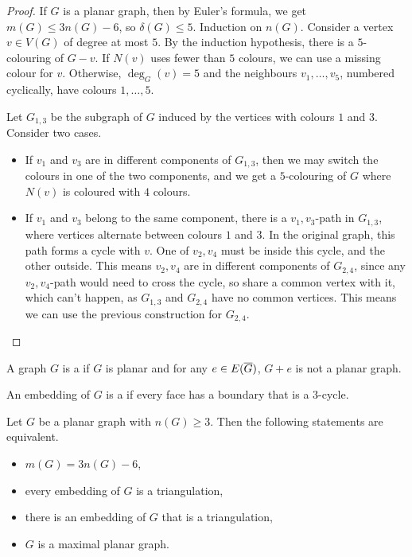 \begin{proof}
  If $G$ is a planar graph, then by Euler's formula, we get $m(G) \le 3n(G) -
  6$, so $\delta(G) \le 5$.
  Induction on $n(G)$.
  Consider a vertex $v \in V(G)$ of degree at most $5$.
  By the induction hypothesis, there is a $5$-colouring of $G-v$.
  If $N(v)$ uses fewer than $5$ colours, we can use a missing colour for $v$.
  Otherwise, $\deg_G(v) = 5$ and the neighbours $v_1, \ldots, v_5$, numbered
  cyclically, have colours $1, \ldots, 5$.

  Let $G_{1,3}$ be the subgraph of $G$ induced by the vertices with colours $1$
  and $3$.
  Consider two cases.
  \begin{itemize}
  \item If $v_1$ and $v_3$ are in different components of $G_{1,3}$, then we may
	switch the colours in one of the two components, and we get a $5$-colouring
	of $G$ where $N(v)$ is coloured with $4$ colours.
  \item If $v_1$ and $v_3$ belong to the same component, there is a
	$v_1,v_3$-path in $G_{1,3}$, where vertices alternate between colours $1$
	and $3$.
	In the original graph, this path forms a cycle with $v$.
	One of $v_2, v_4$ must be inside this cycle, and the other outside.
	This means $v_2, v_4$ are in different components of $G_{2,4}$, since any
	$v_2,v_4$-path would need to cross the cycle, so share a common vertex with
	it, which can't happen, as $G_{1,3}$ and $G_{2,4}$ have no common vertices.
	This means we can use the previous construction for $G_{2,4}$.
	\qedhere
  \end{itemize}
\end{proof}


\begin{definition}
  A graph $G$ is a  if $G$ is planar and for any $e
  \in E(\overline{G})$, $G+e$ is not a planar graph.
\end{definition}

\begin{definition}
  An embedding of $G$ is a  if every face has a boundary
  that is a $3$-cycle.
\end{definition}

\begin{proposition}
  Let $G$ be a planar graph with $n(G) \ge 3$.
  Then the following statements are equivalent.
  \begin{itemize}
  \item $m(G) = 3n(G) - 6$,
  \item every embedding of $G$ is a triangulation,
  \item there is an embedding of $G$ that is a triangulation,
  \item $G$ is a maximal planar graph.
  \end{itemize}
\end{proposition}

